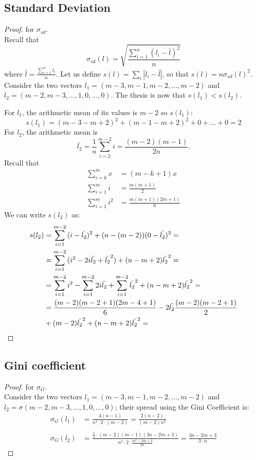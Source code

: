 \documentclass[version=3.21, pagesize, twoside=off, bibliography=totoc, DIV=calc, fontsize=12pt, a4paper]{scrartcl}
\begin{document}
\subsection{Standard Deviation}
\begin{proof} for $\sigma_{sd}$. \\
	Recall that 
	\[\sigma_{sd}(l)= \sqrt{\frac{\sum_{i=1}^{n}(l_i-\bar{l})^2}{n}}\]	
	where $\bar{l}=\frac{\sum_{i=1}^{n}l_i}{n}$.
	Let us define $s(l)= \sum_{i}|l_i-\bar{l}|$, so that $s(l) = n \sigma_{sd}(l)^2$.
	Consider the two vectors $l_1=(m-3, m-1, m-2, \dots, m-2)$ and $l_2=(m-2, m-3, \dots, 1, 0, \dots, 0)$. The thesis is now that $s(l_1) < s(l_2)$.
	
	For $l_1$, the arithmetic mean of its values is $m-2$ so $s(l_1)$: 
	\[s(l_1)=(m-3-m+2)^2+(m-1-m+2)^2+ 0 + \dots + 0= 2\]
	For $l_2$, the arithmetic mean is 
	\[\bar{l_2}=\frac{1}{n}\sum_{i=2}^{m-2}{i}= \frac{(m-2)(m-1)}{2n}.\]
	Recall that 
	\begin{align}
		\sum_{i=k}^{m}{x} &= (m-k+1)x \\
		\sum_{i=1}^{m}{i} &= \frac{m(m+1)}{2}\\
		\sum_{i=1}^{m}{i^2} &= \frac{m(m+1)(2m+1)}{6}
	\end{align}
	We can write $s(l_2)$ as:
	\begin{align}
		s(l_2)&= \sum_{i=1}^{m-2}{(i-\bar{l_2})^2}+(n-(m-2))(0-\bar{l_2})^2=\\
		&= \sum_{i=1}^{m-2}{(i^2-2i\bar{l_2}+\bar{l_2}^2)}+(n-m+2)\bar{l_2}^2=\\
		&= \sum_{i=1}^{m-2}{i^2}-\sum_{i=1}^{m-2}{2i\bar{l_2}}+ \sum_{i=1}^{m-2}{\bar{l_2}^2}+(n-m+2)\bar{l_2}^2=\\
		&=\frac{(m-2)(m-2+1)(2m-4+1)}{6}-2\bar{l_2}\frac{(m-2)(m-2+1)}{2} \\
		& +(m-2)\bar{l_2}^2 +(n-m+2)\bar{l_2}^2= \\
	\end{align} 

\end{proof}

\subsection{Gini coefficient}
\begin{proof} for $\sigma_{G}$. \\
	Consider the two vectors $l_1=(m-3, m-1, m-2, \dots, m-2)$ and $l_2=\sigma(m-2, m-3, \dots, 1, 0, \dots, 0)$; their spread using the Gini Coefficient is: 
	\begin{equation}
		\begin{split}
			\sigma_{G}(l_1) &=\frac{4(n-1)}{n^2\cdot 2 \cdot (m-2)}= \frac{2(n-2)}{(m-2)n^2} \\ \\
			\sigma_{G}(l_2)&=\frac{\frac{1}{3}\cdot(m-2)(m-1)(3n-2m+3)}{n^2\cdot 2 \cdot \frac{m^2-3m+2}{2n}}=\frac{3n-2m+3}{3\cdot n}
		\end{split}
	\end{equation}
\end{proof}
\end{document}
